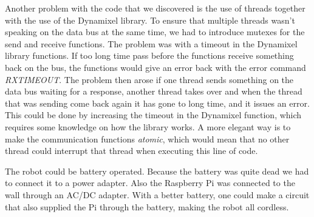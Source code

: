 Another problem with the code that we discovered is the use of threads together with the use of the Dynamixel library. To ensure that multiple threads wasn't speaking on the data bus at the same time, we had to introduce mutexes for the send and receive functions. The problem was with a timeout in the Dynamixel library functions. If too long time pass before the functions receive something back on the bus, the functions would give an error back with the error command \textit{RXTIMEOUT}. The problem then arose if one thread sends something on the data bus waiting for a response, another thread takes over and when the thread that was sending come back again it has gone to long time, and it issues an error. This could be done by increasing the timeout in the Dynamixel function, which requires some knowledge on how the library works. 
A more elegant way is to make the communication functions \textit{atomic}, which would mean that no other thread could interrupt that thread when executing this line of code. %
\bigskip

The robot could be battery operated. Because the battery was quite dead we had to connect it to a power adapter. Also the Raspberry Pi was connected to the wall through an AC/DC adapter. With a better battery, one could make a circuit that also supplied the Pi through the battery, making the robot all cordless.


